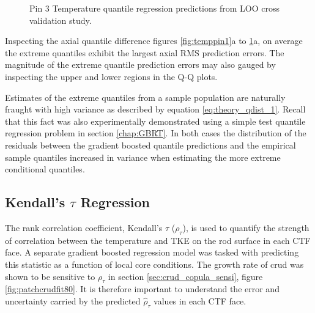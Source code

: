 \begin{figure}[H]%
    \captionsetup[subfigure]{justification=centering}
    \centering
    \hspace*{-1.0em}%
    \caption[Q-Q LOO Temperature pin 3 results.]{Pin 3 Temperature quantile regression predictions from LOO cross validation study.}%
    \label{fig:temppin3}%
\end{figure}

Inspecting the axial quantile difference figures \ref{fig:temppin1}a to \ref{fig:temppin3}a, on average the extreme quantiles exhibit the largest axial RMS prediction errors.  The magnitude of the extreme quantile prediction errors may also gauged by inspecting the upper and lower regions in the Q-Q plots.

Estimates of the extreme quantiles from a sample population are naturally fraught with high variance as described by equation \ref{eq:theory_qdist_1}.  Recall that this fact was also experimentally demonstrated using a simple test quantile regression problem in section \ref{chap:GBRT}.  In both cases the distribution of the residuals between the gradient boosted quantile predictions and the empirical sample quantiles increased in variance when estimating the more extreme conditional quantiles.


\subsection{Kendall's $\tau$ Regression}

The rank correlation coefficient, Kendall's $\tau$ ($\rho_\tau$), is used to quantify the strength of correlation between the temperature and TKE on the rod surface in each CTF face.  A separate gradient boosted regression model was tasked with predicting this statistic as a function of local core conditions.   The growth rate of crud was shown to be sensitive to   $\rho_\tau$ in section \ref{sec:crud_copula_sensi}, figure \ref{fig:patchcrudfit80}.  It is therefore important to understand the error and uncertainty carried by the predicted $\hat \rho_\tau$ values in each CTF face.

